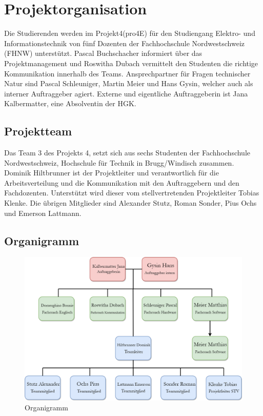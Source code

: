 \documentclass[10pt,a4paper,oneside]{99_fhnwreport}
\begin{document}
\section{Projektorganisation}\label{sec:projektorganisation}
Die Studierenden werden im Projekt4(pro4E) für den Studiengang Elektro- und Informationstechnik von fünf Dozenten der Fachhochschule Nordwestschweiz (FHNW) unterstützt. Pascal Buchschacher informiert über das Projektmanagement und Roswitha Dubach vermittelt den Studenten die richtige Kommunikation innerhalb des Teams. Ansprechpartner für Fragen technischer Natur sind Pascal Schleuniger, Martin Meier und Hans Gysin, welcher auch als interner Auftraggeber agiert.
Externe und eigentliche Auftraggeberin ist Jana Kalbermatter, eine Absolventin der HGK.
\subsection{Projektteam}\label{subsec:projektteam}
Das Team 3 des Projekts 4, setzt sich aus sechs Studenten der Fachhochschule Nordwestschweiz, Hochschule für Technik in Brugg/Windisch zusammen. Dominik Hiltbrunner ist der Projektleiter und verantwortlich für die Arbeitsverteilung und die Kommunikation mit den Auftraggebern und den Fachdozenten. Unterstützt wird dieser vom stellvertretenden Projektleiter Tobias Klenke. Die übrigen Mitglieder sind Alexander Stutz, Roman Sonder, Pius Ochs und Emerson Lattmann. 
\newpage
\subsection{Organigramm}\label{subsec:organigramm}


\begin{figure}[htbp]
	\centering
	\includegraphics[width=13.5cm]{pro4E_Struktur.png}
		\caption{Organigramm}
\end{figure}
\end{document}
